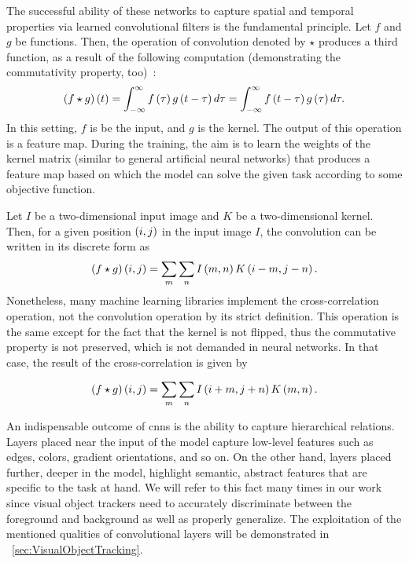 The successful ability of these networks to capture spatial and temporal properties via learned convolutional filters is the fundamental principle. Let $f$ and $g$ be functions. Then, the operation of convolution denoted by $\star$ produces a third function, as a result of the following computation (demonstrating the commutativity property, too)~\cite{goodfellow2016dl}:
\begin{equation}
    \label{eq:ConvolutionContinuous}
    {\left( {f \star g} \right)} \left( t \right) =
    \int_{-\infty}^{\infty}
    {f} \left( \tau \right)
    {g} \left( t - \tau \right)
    d\tau =
    \int_{-\infty}^{\infty}
    {f} \left( t -\tau \right)
    {g} \left( \tau \right)
    d\tau.
\end{equation}
In this setting, $f$ is be the input, and $g$ is the kernel. The output of this operation is a feature map. During the training, the aim is to learn the weights of the kernel matrix (similar to general artificial neural networks) that produces a feature map based on which the model can solve the given task according to some objective function.

Let $I$ be a two-dimensional input image and $K$ be a two-dimensional kernel. Then, for a given position $\left( {i, j} \right)$ in the input image $I$, the convolution can be written in its discrete form as
\begin{equation}
    \label{eq:ConvolutionDiscrete}
    {\left( {f \star g} \right)} \left( i, j \right) =
    \sum_{m}
    \sum_{n}
    {I} \left( m, n \right)
    {K} \left( i - m, j - n \right).
\end{equation}
Nonetheless, many machine learning libraries implement the cross-correlation operation, not the convolution operation by its strict definition. This operation is the same except for the fact that the kernel is not flipped, thus the commutative property is not preserved, which is not demanded in neural networks. In that case, the result of the cross-correlation is given by~\cite{goodfellow2016dl}

\begin{equation}
    \label{eq:CrossCorrelation}
    {\left( {f \star g} \right)} \left( i, j \right) =
    \sum_{m}
    \sum_{n}
    {I} \left( i + m, j + n \right)
    {K} \left( m, n \right).
\end{equation}

An indispensable outcome of \glspl{cnn} is the ability to capture hierarchical relations. Layers placed near the input of the model capture low-level features such as edges, colors, gradient orientations, and so on. On the other hand, layers placed further, deeper in the model, highlight semantic, abstract features that are specific to the task at hand. We will refer to this fact many times in our work since visual object trackers need to accurately discriminate between the foreground and background as well as properly generalize. The exploitation of the mentioned qualities of convolutional layers will be demonstrated in \sectionstr{}~\ref{sec:VisualObjectTracking}.

